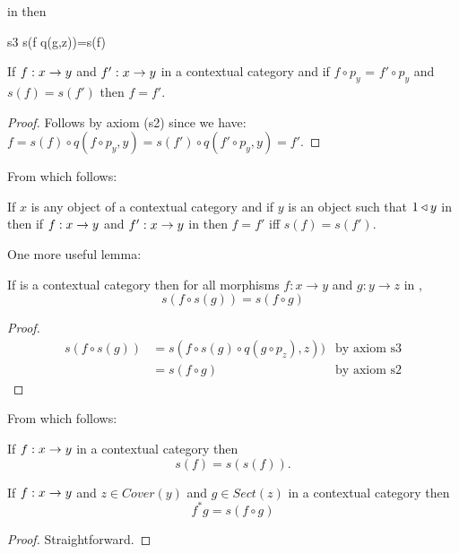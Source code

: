 \noindent in  then

\begin{axiom}{s3}
s(f \circ q(g,z))=s(f)
\end{axiom}

\begin{lemma}
If $f: x \rightarrow y$ and $f':x \rightarrow y$ in a contextual category \catcw and if 
$f \circ p_y$ = $f' \circ p_y$ and $s(f) = s(f')$ then $f=f'$.
\end{lemma}
\begin{proof}
Follows by axiom (s2) since we have:
$f = s(f) \circ q(f \circ p_y,y)  = s(f') \circ q(f' \circ p_y,y) = f'$.
\end{proof}
From which follows:
\begin{lemma}
If $x$ is any object of a contextual category \catcw and if $y$ is an object such that $1 \triangleleft y$ in \catcw then
if $f: x \rightarrow y$ and $f':x \rightarrow y$ in  \catcw then $f=f'$ iff $s(f) = s(f')$.
\end{lemma}
One more useful lemma:
\begin{lemma}
\label{s4}  
If  is a contextual category then for all morphisms $f: x \rightarrow y$ and $g:y \rightarrow z$ in ,
$$s(f \circ s(g)) = s(f \circ g)$$
\end{lemma}
\begin{proof}
\begin{align*}
s( f \circ s(g)) 
    & = s( f \circ s(g)\circ q(g \circ p_z) , z ))  &\mbox{by axiom s3}\\
    & = s(f \circ g) &\mbox{by axiom s2} 
\end{align*}
\end{proof}
From which follows:
\begin{lemma}
If $f:x \rightarrow y$  in a contextual category \catcw  then
\begin{equation*}
s(f)=s(s(f)).
\end{equation*}
\end{lemma}
\begin{lemma}
If $f:x \rightarrow y$ and $z \in Cover(y)$ and $g \in Sect(z)$ in a contextual category \catcw then
\begin{equation*}
f^*g = s(f \circ g)
\end{equation*} 
\end{lemma}
\begin{proof}
Straightforward.
\end{proof}

